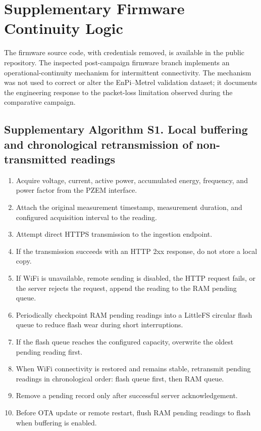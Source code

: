 \documentclass[technologies,article,submit,pdftex,moreauthors]{Definitions/mdpi}
\begin{document}
\section{Supplementary Firmware Continuity Logic}

The firmware source code, with credentials removed, is available in the public repository. The inspected post-campaign firmware branch implements an operational-continuity mechanism for intermittent connectivity. The mechanism was not used to correct or alter the EnPi--Metrel validation dataset; it documents the engineering response to the packet-loss limitation observed during the comparative campaign.

\subsection*{Supplementary Algorithm S1. Local buffering and chronological retransmission of non-transmitted readings}
\begin{enumerate}
\item Acquire voltage, current, active power, accumulated energy, frequency, and power factor from the PZEM interface.
\item Attach the original measurement timestamp, measurement duration, and configured acquisition interval to the reading.
\item Attempt direct HTTPS transmission to the ingestion endpoint.
\item If the transmission succeeds with an HTTP 2xx response, do not store a local copy.
\item If WiFi is unavailable, remote sending is disabled, the HTTP request fails, or the server rejects the request, append the reading to the RAM pending queue.
\item Periodically checkpoint RAM pending readings into a LittleFS circular flash queue to reduce flash wear during short interruptions.
\item If the flash queue reaches the configured capacity, overwrite the oldest pending reading first.
\item When WiFi connectivity is restored and remains stable, retransmit pending readings in chronological order: flash queue first, then RAM queue.
\item Remove a pending record only after successful server acknowledgement.
\item Before OTA update or remote restart, flush RAM pending readings to flash when buffering is enabled.
\end{enumerate}
\end{document}
